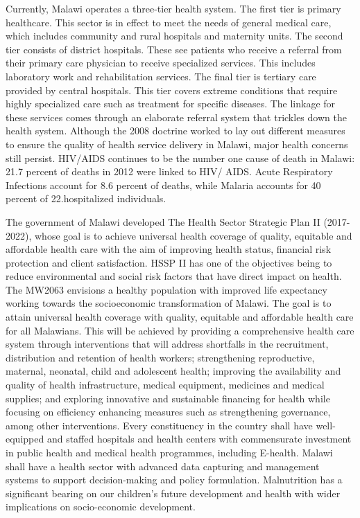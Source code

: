\documentclass[
]{book}
\begin{document}
Currently, Malawi operates a three-tier health system. The first tier is primary healthcare. This sector is in effect to meet the needs of general medical care,
which includes community and rural hospitals and maternity units. The second tier consists of district hospitals. These see patients who receive a referral from
their primary care physician to receive specialized services. This includes laboratory work and rehabilitation services. The final tier is tertiary care provided
by central hospitals. This tier covers extreme conditions that require highly specialized care such as treatment for specific diseases. The linkage for these
services comes through an elaborate referral system that trickles down the health system. Although the 2008 doctrine worked to lay out different measures to
ensure the quality of health service delivery in Malawi, major health concerns still persist. HIV/AIDS continues to be the number one cause of death in Malawi:
21.7 percent of deaths in 2012 were linked to HIV/ AIDS. Acute Respiratory Infections account for 8.6 percent of deaths, while Malaria accounts for 40 percent of
22.hospitalized individuals.

The government of Malawi developed The Health Sector Strategic Plan II (2017-2022), whose goal is to achieve universal health coverage of quality, equitable and
affordable health care with the aim of improving health status, financial risk protection and client satisfaction. HSSP II has one of the objectives being to
reduce environmental and social risk factors that have direct impact on health. The MW2063 envisions a healthy population with improved life expectancy working
towards the socioeconomic transformation of Malawi. The goal is to attain universal health coverage with quality, equitable and affordable health care for all
Malawians. This will be achieved by providing a comprehensive health care system through interventions that will address shortfalls in the recruitment,
distribution and retention of health workers; strengthening reproductive, maternal, neonatal, child and adolescent health; improving the availability and quality
of health infrastructure, medical equipment, medicines and medical supplies; and exploring innovative and sustainable financing for health while focusing on
efficiency enhancing measures such as strengthening governance, among other interventions. Every constituency in the country shall have well-equipped and staffed
hospitals and health centers with commensurate investment in public health and medical health programmes, including E-health. Malawi shall have a health sector
with advanced data capturing and management systems to support decision-making and policy formulation. Malnutrition has a significant bearing on our children's
future development and health with wider implications on socio-economic development.
\end{document}

